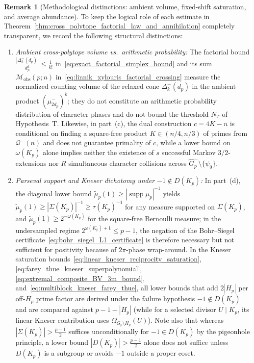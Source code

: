 \documentclass[11pt, a4paper]{article}
\theoremstyle{plain}
\theoremstyle{definition}
\newtheorem{remark}[theorem]{Remark}
\begin{document}
\begin{remark}[Methodological distinctions: ambient volume, fixed-shift saturation, and average abundance]\label{rem:cross_polytope_methodological}
To keep the logical role of each estimate in Theorem~\ref{thm:cross_polytope_factorial_law_and_annihilation} completely transparent, we record the following structural distinctions:
\begin{enumerate}[(1)]
    \item \emph{Ambient cross-polytope volume vs.\ arithmetic probability:} The factorial bound $\frac{|\Delta_k^{-}(d_p)|}{d_p^{k}}\le\frac{1}{k!}$ in~\eqref{eq:exact_factorial_simplex_bound} and its sum $\mathcal{M}_{\mathrm{obs}}(p;n)$ in~\eqref{eq:linnik_xylouris_factorial_crossing} measure the normalized counting volume of the relaxed cone $\Delta_k^{-}(d_p)$ in the ambient product $(\mu_{2d_p}^{-})^{k}$; they do not constitute an arithmetic probability distribution of character phases and do not bound the threshold $N_T$ of Hypothesis~T. Likewise, in part~(c), the dual construction $c=4K-n$ is conditional on finding a square-free product $K\in(n/4,n/3)$ of primes from $\mathcal{Q}^{-}(n)$ and does not guarantee primality of $c$, while a lower bound on $\omega(K_p)$ alone implies neither the existence of $s$ successful Markov $3/2$-extensions nor $R$ simultaneous character collisions across $\widehat{G}_p^{-}\setminus\{\psi_0\}$.
    \item \emph{Parseval support and Kneser dichotomy under $-1\notin D(K_p)$:} In part~(d), the diagonal lower bound $\widetilde{\mu}_p(1)\ge|\operatorname{supp}\mu_p|^{-1}$ yields $\widetilde{\mu}_p(1)\ge|\Sigma(K_p)|^{-1}\ge\tau(K_p)^{-1}$ for any measure supported on $\Sigma(K_p)$, and $\widetilde{\mu}_p(1)\ge 2^{-\omega(K_p)}$ for the square-free Bernoulli measure; in the undersampled regime $2^{\omega(K_p)+1}\le p-1$, the negation of the Bohr--Siegel certificate~\eqref{eq:bohr_siegel_L1_certificate} is therefore necessary but not sufficient for positivity because of $2\pi$-phase wrap-around. In the Kneser saturation bounds~\eqref{eq:linear_kneser_reciprocity_saturation}, \eqref{eq:farey_thue_kneser_superpolynomial}, \eqref{eq:extremal_composite_BV_3m_bound}, and~\eqref{eq:multiblock_kneser_farey_thue}, all lower bounds that add $2|H_p|$ per off-$H_p$ prime factor are derived under the failure hypothesis $-1\notin D(K_p)$ and are compared against $p-1-|H_p|$ (while for a selected divisor $U\mid K_p$, its linear Kneser contribution uses $\Omega_{G_p\setminus H_p}(U)$). Note also that whereas $|\Sigma(K_p)|>\frac{p-1}{2}$ suffices unconditionally for $-1\in D(K_p)$ by the pigeonhole principle, a lower bound $|D(K_p)|>\frac{p-1}{2}$ alone does not suffice unless $D(K_p)$ is a subgroup or avoids $-1$ outside a proper coset.

\end{enumerate}
\end{remark}
\end{document}
